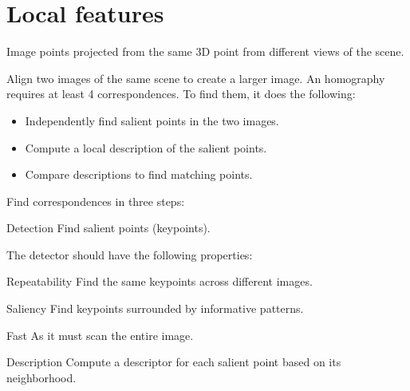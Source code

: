 \chapter{Local features}

\begin{description}
    \item[Correspondence points] 
        Image points projected from the same 3D point from different views of the scene.

        \begin{example}[Homography]
            Align two images of the same scene to create a larger image.
            An homography requires at least 4 correspondences. 
            To find them, it does the following:
            \begin{itemize}
                \item Independently find salient points in the two images.
                \item Compute a local description of the salient points.
                \item Compare descriptions to find matching points.
            \end{itemize}
        \end{example}


    \item[Local invariant features] 
        Find correspondences in three steps:
        \begin{descriptionlist}
            \item[Detection] 
                Find salient points (keypoints).
            
                The detector should have the following properties:
                \begin{descriptionlist}
                    \item[Repeatability] Find the same keypoints across different images.
                    \item[Saliency] Find keypoints surrounded by informative patterns.
                    \item[Fast] As it must scan the entire image. 
                \end{descriptionlist}
            

            \item[Description] 
                Compute a descriptor for each salient point based on its neighborhood.
            

\end{descriptionlist}
\end{description}

